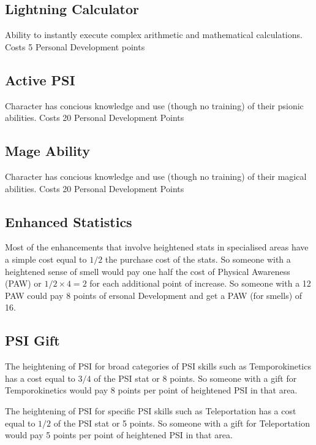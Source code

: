 \subsection{Lightning Calculator}

Ability to instantly execute complex arithmetic and mathematical
calculations.
Costs 5 Personal Development points

\subsection{Active PSI}

Character has concious knowledge and use (though no training) of their psionic abilities.
Costs 20 Personal Development Points

\subsection{Mage Ability}

Character has concious knowledge and use (though no training) of their magical abilities.
Costs 20 Personal Development Points

\subsection{Enhanced Statistics}

Most of the enhancements that involve heightened stats in specialised areas
have a simple cost equal to $ 1/2 $ the purchase cost of the stats.
So someone with a heightened sense of smell would pay one half the cost of
Physical Awareness (PAW) or $ 1/2 \times 4  = 2$ for each additional point
of increase. So someone with a 12 PAW could pay 8 points of ersonal Development and get a PAW (for
smells) of 16.

\subsection{PSI Gift}

The heightening of PSI for broad categories of PSI skills such as
Temporokinetics has a cost equal to $ 3/4 $ of the PSI stat or 8 points.
So someone with a gift for Temporokinetics would pay 8 points per point of
heightened PSI in that area. 

The heightening of PSI for specific PSI skills such as
Teleportation has a cost equal to $ 1/2 $ of the PSI stat or 5 points.
So someone with a gift for Teleportation would pay 5 points per point of
heightened PSI in that area. 

